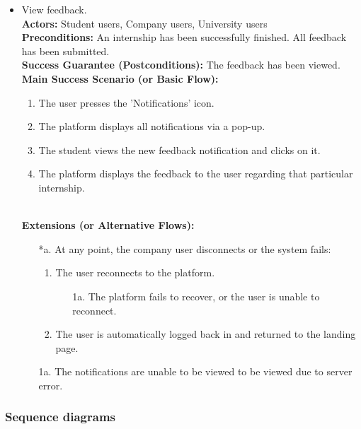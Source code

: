 \begin{itemize}[label={[\textbf{UC}]}, align=left, leftmargin=*]
    \item {} View feedback. \\
    \textbf{Actors:} Student users, Company users, University users\\
     \textbf{Preconditions:} An internship has been successfully finished. All feedback has been submitted.\\
     \textbf{Success Guarantee (Postconditions):} The feedback has been viewed. \\
     \textbf{Main Success Scenario (or Basic Flow):} 
     \begin{enumerate}[label=\arabic*.] 
        \item The user presses the 'Notifications' icon.
        \item The platform displays all notifications via a pop-up.
        \item The student views the new feedback notification and clicks on it.
        \item The platform displays the feedback to the user regarding that particular internship.
     \end{enumerate} \\

    \textbf{Extensions (or Alternative Flows):} 
    \begin{enumerate}[label=\arabic*.]
        \item[*a.] At any point, the company user disconnects or the system fails:
            \begin{enumerate}[label=\arabic*.]
                \item The user reconnects to the platform.
                    \begin{enumerate}[label=\alph*.]
                        \item[1a.] The platform fails to recover, or the user is unable to reconnect.
                    \end{enumerate}
                 \item The user is automatically logged back in and returned to the landing page.
            \end{enumerate}
        \item[1a.] The notifications are unable to be viewed to be viewed due to server error.
        \end{enumerate}
\end{itemize}



\subsubsection{Sequence diagrams}
